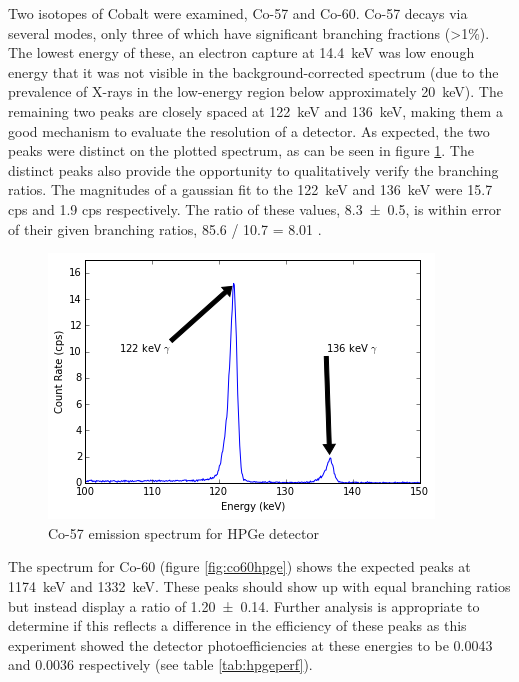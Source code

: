 \documentclass[12pt]{article}
\begin{document}
Two isotopes of Cobalt were examined, Co-57 and Co-60. Co-57 decays via several modes, only three of which have significant branching fractions (>1\%). The lowest energy of these, an electron capture at \SI{14.4}{\kilo\electronvolt} was low enough energy that it was not visible in the background-corrected spectrum (due to the prevalence of X-rays in the low-energy region below approximately \SI{20}{\kilo\electronvolt}). The remaining two peaks are closely spaced at \SI{122}{\kilo\electronvolt} and \SI{136}{\kilo\electronvolt}, making them a good mechanism to evaluate the resolution of a detector. As expected, the two peaks were distinct on the plotted spectrum, as can be seen in figure \ref{fig:co57hpge}. The distinct peaks also provide the opportunity to qualitatively verify the branching ratios. The magnitudes of a gaussian fit to the \SI{122}{\kilo\electronvolt} and \SI{136}{\kilo\electronvolt} were 15.7 cps and 1.9 cps respectively. The ratio of these values, \num{8.3 \pm 0.5}, is within error of their given branching ratios, 85.6 / 10.7 = 8.01 \cite{nucdata}.

\begin{center}
\begin{figure}
	\includegraphics{hpge_co57}
	\caption{Co-57 emission spectrum for HPGe detector}
	\label{fig:co57hpge}
\end{figure}
\end{center}

The spectrum for Co-60 (figure \ref{fig:co60hpge}) shows the expected peaks at \SI{1174}{\kilo\electronvolt} and \SI{1332}{\kilo\electronvolt}. These peaks should show up with equal branching ratios but instead display a ratio of \num{1.20 \pm 0.14}. Further analysis is appropriate to determine if this reflects a difference in the efficiency of these peaks as this experiment showed the detector photoefficiencies at these energies to be 0.0043 and 0.0036 respectively (see table \ref{tab:hpgeperf}).
\end{document}
